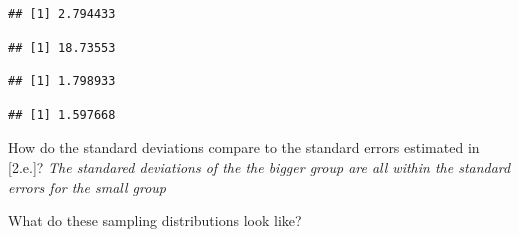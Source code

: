 \documentclass[]{article}
\newenvironment{Shaded}{\begin{snugshade}}{\end{snugshade}}
\newcommand{\KeywordTok}[1]{\textcolor[rgb]{0.13,0.29,0.53}{\textbf{#1}}}
\newcommand{\DataTypeTok}[1]{\textcolor[rgb]{0.13,0.29,0.53}{#1}}
\newcommand{\StringTok}[1]{\textcolor[rgb]{0.31,0.60,0.02}{#1}}
\newcommand{\OperatorTok}[1]{\textcolor[rgb]{0.81,0.36,0.00}{\textbf{#1}}}
\newcommand{\NormalTok}[1]{#1}
\begin{document}
\begin{verbatim}
## [1] 2.794433
\end{verbatim}

\begin{Shaded}
\end{Shaded}

\begin{verbatim}
## [1] 18.73553
\end{verbatim}

\begin{Shaded}
\end{Shaded}

\begin{verbatim}
## [1] 1.798933
\end{verbatim}

\begin{Shaded}
\end{Shaded}

\begin{verbatim}
## [1] 1.597668
\end{verbatim}

How do the standard deviations compare to the standard errors estimated
in {[}2.e.{]}? \emph{The standared deviations of the the bigger group
are all within the standard errors for the small group}

What do these sampling distributions look like?

\begin{Shaded}
\end{Shaded}
\end{document}
